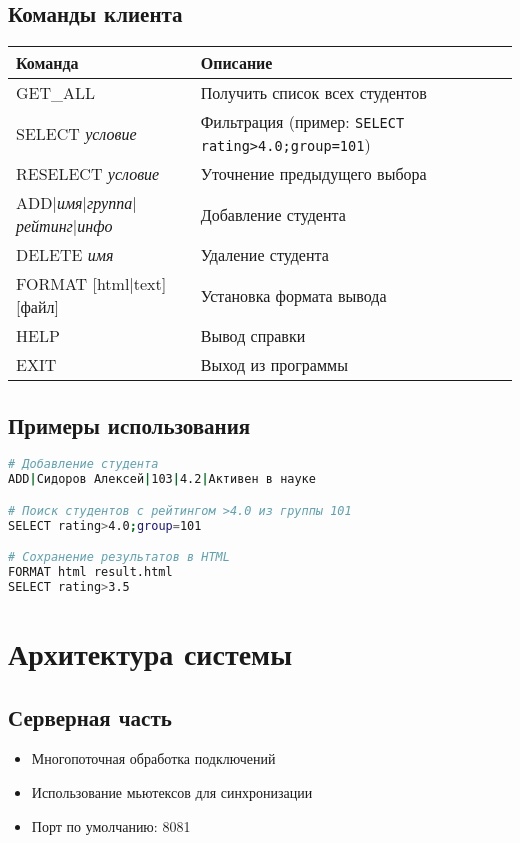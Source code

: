 \documentclass[a4paper,12pt]{article}
\begin{document}
\subsection{Команды клиента}
\begin{tabular}{|l|p{8cm}|}
\hline
\textbf{Команда} & \textbf{Описание} \\ \hline
GET\_ALL & Получить список всех студентов \\ \hline
SELECT \textit{условие} & Фильтрация (пример: \texttt{SELECT rating>4.0;group=101}) \\ \hline
RESELECT \textit{условие} & Уточнение предыдущего выбора \\ \hline
ADD|\textit{имя}|\textit{группа}|\textit{рейтинг}|\textit{инфо} & Добавление студента \\ \hline
DELETE \textit{имя} & Удаление студента \\ \hline
FORMAT [html|text] [файл] & Установка формата вывода \\ \hline
HELP & Вывод справки \\ \hline
EXIT & Выход из программы \\ \hline
\end{tabular}

\subsection{Примеры использования}
\begin{lstlisting}[language=bash]
# Добавление студента
ADD|Сидоров Алексей|103|4.2|Активен в науке

# Поиск студентов с рейтингом >4.0 из группы 101
SELECT rating>4.0;group=101

# Сохранение результатов в HTML
FORMAT html result.html
SELECT rating>3.5
\end{lstlisting}

\section{Архитектура системы}
\subsection{Серверная часть}
\begin{itemize}
\item Многопоточная обработка подключений
\item Использование мьютексов для синхронизации
\item Порт по умолчанию: 8081
\end{itemize}
\end{document}
